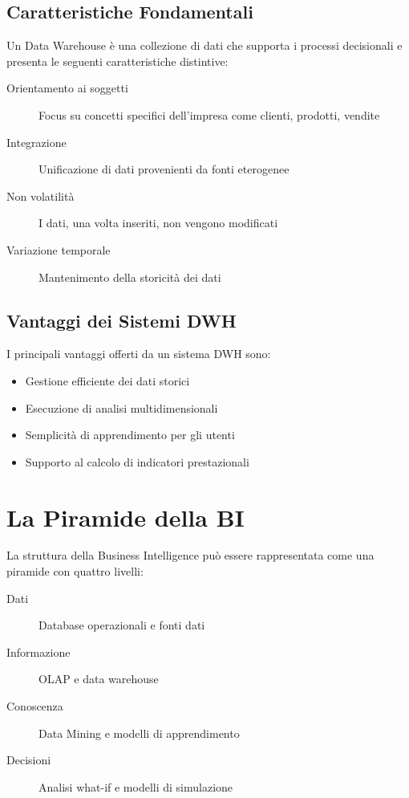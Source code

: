 \subsection{Caratteristiche Fondamentali}
Un Data Warehouse è una collezione di dati che supporta i processi decisionali e presenta le seguenti caratteristiche distintive:

\begin{description}
\item[Orientamento ai soggetti] Focus su concetti specifici dell'impresa come clienti, prodotti, vendite
\item[Integrazione] Unificazione di dati provenienti da fonti eterogenee
\item[Non volatilità] I dati, una volta inseriti, non vengono modificati
\item[Variazione temporale] Mantenimento della storicità dei dati
\end{description}

\subsection{Vantaggi dei Sistemi DWH}
I principali vantaggi offerti da un sistema DWH sono:
\begin{itemize}
\item Gestione efficiente dei dati storici
\item Esecuzione di analisi multidimensionali
\item Semplicità di apprendimento per gli utenti
\item Supporto al calcolo di indicatori prestazionali
\end{itemize}

\section{La Piramide della BI}
La struttura della Business Intelligence può essere rappresentata come una piramide con quattro livelli:

\begin{description}
\item[Dati] Database operazionali e fonti dati
\item[Informazione] OLAP e data warehouse
\item[Conoscenza] Data Mining e modelli di apprendimento
\item[Decisioni] Analisi what-if e modelli di simulazione
\end{description}

